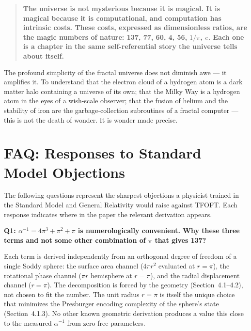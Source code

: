     \begin{quote}
    \textbf{The universe is not mysterious because it is magical. It is magical
    because it is computational, and computation has intrinsic costs. These costs,
    expressed as dimensionless ratios, are the magic numbers of nature: 137, 77,
    60, 4, 56, $1/\pi$, $e$. Each one is a chapter in the same self-referential
    story the universe tells about itself.}
    \end{quote}

    The profound simplicity of the fractal universe does not diminish awe --- it
    amplifies it. To understand that the electron cloud of a hydrogen atom is a
    dark matter halo containing a universe of its own; that the Milky Way is a
    hydrogen atom in the eyes of a wish-scale observer; that the fusion of helium
    and the stability of iron are the garbage-collection subroutines of a fractal
    computer --- this is not the death of wonder. It is wonder made precise.



\section{FAQ: Responses to Standard Model Objections}

  The following questions represent the sharpest objections a physicist trained
  in the Standard Model and General Relativity would raise against TFOFT.
  Each response indicates where in the paper the relevant derivation appears.

  \begin{mdframed}
  \textbf{Q1: $\alpha^{-1} = 4\pi^3 + \pi^2 + \pi$ is numerologically convenient.
  Why these three terms and not some other combination of $\pi$ that gives 137?}
  \end{mdframed}

  Each term is derived independently from an orthogonal degree of freedom of a single
  Soddy sphere: the surface area channel ($4\pi r^2$ evaluated at $r = \pi$), the
  rotational phase channel ($\pi r$ hemisphere at $r = \pi$), and the radial
  displacement channel ($r = \pi$). The decomposition is forced by the geometry
  (Section~4.1--4.2), not chosen to fit the number. The unit radius $r = \pi$ is
  itself the unique choice that minimizes the Presburger encoding complexity of
  the sphere's state (Section~4.1.3). No other known geometric derivation produces
  a value this close to the measured $\alpha^{-1}$ from zero free parameters.

